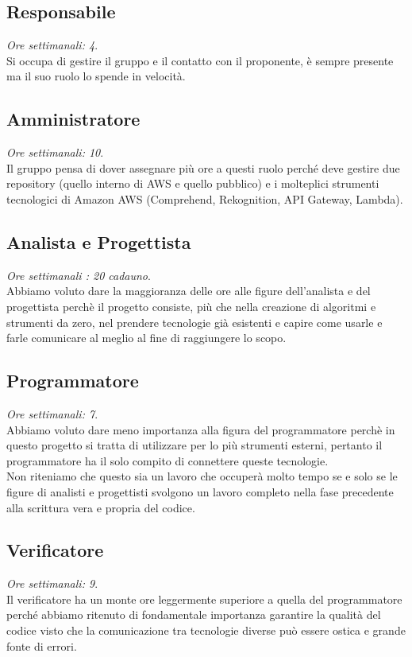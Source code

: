 \documentclass{classes/base}
\begin{document}
    \subsection*{Responsabile}
    \textit{Ore settimanali: 4}.\\
    Si occupa di gestire il gruppo e il contatto con il proponente, è sempre presente ma il suo ruolo lo spende in velocità.
    \subsection*{Amministratore}
    \textit{Ore settimanali: 10}.\\
    Il gruppo pensa di dover assegnare più ore a questi ruolo perché deve gestire due repository (quello interno di AWS e quello pubblico) e i molteplici strumenti tecnologici di Amazon AWS (Comprehend, Rekognition, API Gateway, Lambda).
    \subsection*{Analista e Progettista}
    \textit{Ore settimanali : 20 cadauno}.\\
    Abbiamo voluto dare la maggioranza delle ore alle figure dell'analista e del progettista perchè il progetto consiste, più che nella creazione di algoritmi e strumenti da zero, nel prendere tecnologie già esistenti e capire come usarle e farle comunicare al meglio al fine di raggiungere lo scopo. 
    \subsection*{Programmatore}
    \textit{Ore settimanali: 7}.\\
    Abbiamo voluto dare meno importanza alla figura del programmatore perchè in questo progetto si tratta di utilizzare per lo più strumenti esterni, pertanto il programmatore ha il solo compito di connettere queste tecnologie.\\ Non riteniamo che questo sia un lavoro che occuperà molto tempo se e solo se le figure di analisti e progettisti svolgono un lavoro completo nella fase precedente alla scrittura vera e propria del codice.
    \subsection*{Verificatore}
    \textit{Ore settimanali: 9}.\\
    Il verificatore ha un monte ore leggermente superiore a quella del programmatore perché abbiamo ritenuto di fondamentale importanza garantire la qualità del codice visto che la comunicazione tra tecnologie diverse può essere ostica e grande fonte di errori.\\\\
    
\end{document}
